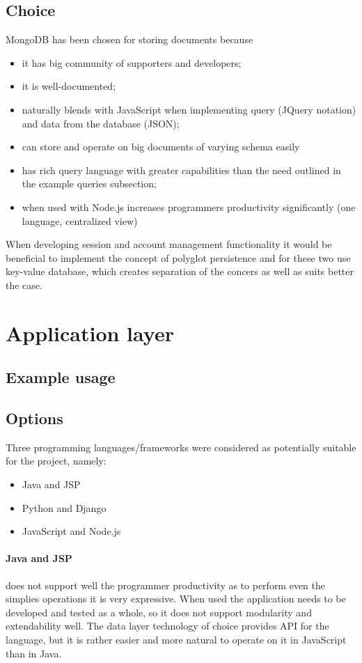 \documentclass[11pt, a4paper]{report}
\begin{document}
\subsection{Choice}
MongoDB has been chosen for storing documents because
\begin{itemize}
  \item it has big community of supporters and developers;
  \item it is well-documented;
  \item naturally blends with JavaScript when implementing query (JQuery notation) and data from the database (JSON);
  \item can store and operate on big documents of varying schema easily
  \item has rich query language with greater capabilities than the need outlined in the example queries subsection;
  \item when used with Node.js increases programmers productivity significantly (one language, centralized view)
\end{itemize}

When developing session and account management functionality it would be beneficial to implement the concept of polyglot persistence and for these two use key-value database, which creates separation of the concers as well as suits better the case.


\section{Application layer}
\subsection{Example usage}

\subsection{Options}
Three programming languages/frameworks were considered as potentially suitable for the project, namely:
\begin{itemize}
  \item Java and JSP
  \item Python and Django
  \item JavaScript and Node.js
\end{itemize}

\paragraph{Java and JSP} does not support well the programmer productivity as to perform even the simplies operations it is very expressive. When used the application needs to be developed and tested as a whole, so it does not support modularity and extendability well. The data layer technology of choice provides API for the language, but it is rather easier and more natural to operate on it in JavaScript than in Java.
\end{document}

